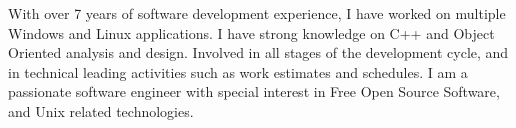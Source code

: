 

\begin{cvparagraph}

With over 7 years of software development experience, I have worked on multiple Windows and Linux applications. I have strong knowledge on C++ and Object Oriented analysis and design. Involved in all stages of the development cycle, and in technical leading activities such as work estimates and schedules. I am a passionate software engineer with special interest in Free Open Source Software, and Unix related technologies.

\end{cvparagraph}
